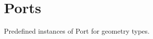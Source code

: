 \hypertarget{group___geometry_ports}{}\section{Ports}
\label{group___geometry_ports}
Predefined instances of Port for geometry types. 

